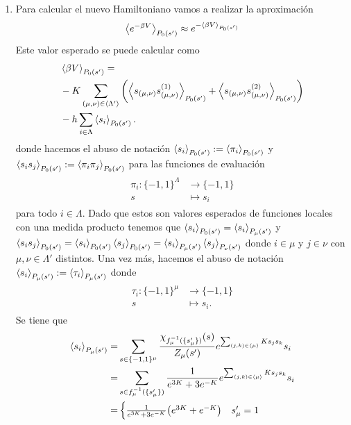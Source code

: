 \documentclass{article}
\begin{document}
\begin{enumerate}
\item Para calcular el nuevo Hamiltoniano vamos a realizar la aproximación
\begin{equation}
\ev{e^{-\beta V}}_{P_0(s')}\approx e^{-\ev{\beta V}_{P_0(s')}}
\end{equation}
Este valor esperado se puede calcular como
\begin{align}
\begin{split}
&\ev{\beta V}_{P_0(s')}=\\
&-K\sum_{(\mu,\nu)\in\ev{\Lambda'}}\qty(\ev{s_{(\mu,\nu)}s_{(\mu,\nu)}^{(1)}}_{P_0(s')}+\ev{s_{(\mu,\nu)}s_{(\mu,\nu)}^{(2)}}_{P_0(s')})\\
&-h\sum_{i\in\Lambda}\ev{s_i}_{P_0(s')}.
\end{split}
\end{align}
donde hacemos el abuso de notación $\ev{s_i}_{P_0(s')}:=\ev{\pi_i}_{P_0(s')}$ y $\ev{s_is_j}_{P_0(s')}:=\ev{\pi_i\pi_j}_{P_0(s')}$ para las funciones de evaluación
\begin{align}
\begin{split}
\pi_i:\{-1,1\}^\Lambda&\rightarrow\{-1,1\}\\
s&\mapsto s_i
\end{split}
\end{align}
para todo $i\in\Lambda$. Dado que estos son valores esperados de funciones locales con una medida producto tenemos que
$\ev{s_i}_{P_0(s')}=\ev{s_i}_{P_\mu(s')}$ y $\ev{s_is_j}_{P_0(s')}=\ev{s_i}_{P_0(s')}\ev{s_j}_{P_0(s')}=\ev{s_i}_{P_\mu(s')}\ev{s_j}_{P_\nu(s')}$ donde $i\in\mu$ y $j\in\nu$ con $\mu,\nu\in\Lambda'$ distintos. Una vez más, hacemos el abuso de notación $\ev{s_i}_{P_\mu(s')}:=\ev{\tau_i}_{P_\mu(s')}$ donde
\begin{align}
\begin{split}
\tau_i:\{-1,1\}^\mu&\rightarrow\{-1,1\}\\
s&\mapsto s_i.
\end{split}
\end{align}
Se tiene que
\begin{align}
\begin{split}
\ev{s_i}_{P_\mu(s')}=&\sum_{s\in\{-1,1\}^\mu}\frac{\chi_{f_\mu^{-1}(\{s'_\mu\})}(s)}{Z_\mu(s')}e^{\sum_{(j,k)\in\ev{\mu}}Ks_js_k}s_i\\
=&\sum_{s\in f_\mu^{-1}(\{s'_\mu\})}\frac{1}{e^{3K}+3e^{-K}}e^{\sum_{(j,k)\in\ev{\mu}}Ks_js_k}s_i\\
=&\begin{cases}
\frac{1}{e^{3K}+3e^{-K}}\qty(e^{3K}+e^{-K}) & s'_\mu=1\\

\end{cases}
\end{split}
\end{align}
\end{enumerate}
\end{document}
